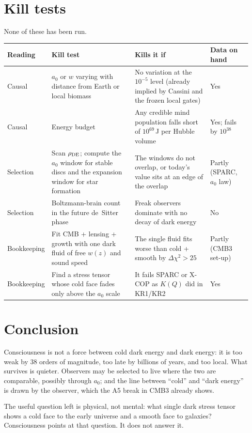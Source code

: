 \documentclass[10pt]{article}
\begin{document}
\section{Kill tests}
None of these has been run.
\begin{center}\small
\begin{tabularx}{\linewidth}{@{}l X X l@{}}
\toprule
Reading & Kill test & Kills it if & Data on hand\\
\midrule
Causal & $a_0$ or $w$ varying with distance from Earth or local biomass & No variation at the $10^{-5}$ level (already implied by Cassini and the frozen local gates) & Yes\\
Causal & Energy budget & Any credible mind population falls short of $10^{69}$\,J per Hubble volume & Yes; fails by $10^{38}$\\
Selection & Scan $\rho_{\rm DE}$; compute the $a_0$ window for stable discs and the expansion window for star formation & The windows do not overlap, or today's value sits at an edge of the overlap & Partly (SPARC, $a_0$ law)\\
Selection & Boltzmann-brain count in the future de~Sitter phase & Freak observers dominate with no decay of dark energy & No\\
Bookkeeping & Fit CMB + lensing + growth with one dark fluid of free $w(z)$ and sound speed & The single fluid fits worse than cold + smooth by $\Delta\chi^2>25$ & Partly (CMB3 set-up)\\
Bookkeeping & Find a stress tensor whose cold face fades only above the $a_0$ scale & It fails SPARC or X-COP as $K(Q)$ did in KR1/KR2 & Yes\\
\bottomrule
\end{tabularx}
\end{center}

\section{Conclusion}
Consciousness is not a force between cold dark energy and dark energy: it is too weak by 38 orders of magnitude, too late by billions of years, and too local. What survives is quieter. Observers may be selected to live where the two are comparable, possibly through $a_0$; and the line between ``cold'' and ``dark energy'' is drawn by the observer, which the A5 break in CMB3 already shows.

The useful question left is physical, not mental: what single dark stress tensor shows a cold face to the early universe and a smooth face to galaxies? Consciousness points at that question. It does not answer it.
\end{document}
